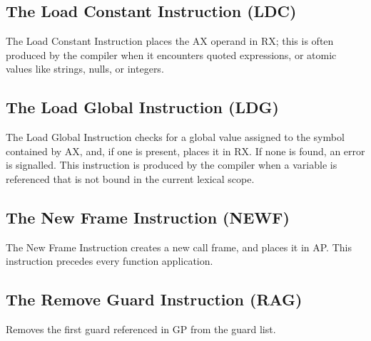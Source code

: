 \documentclass[notitlepage,oneside]{book}
\begin{document}

\subsection{The Load Constant Instruction (LDC)}
\label{i-ldc}

The Load Constant Instruction places the AX operand in RX; this is often produced by the compiler when it encounters quoted expressions, or atomic values like strings, nulls, or integers.


\subsection{The Load Global Instruction (LDG)}
\label{i-ldg}

The Load Global Instruction checks for a global value assigned to the symbol contained by AX, and, if one is present, places it in RX.  If none is found, an error is signalled.  This instruction is produced by the compiler when a variable is referenced that is not bound in the current lexical scope. 


\subsection{The New Frame Instruction (NEWF)}
\label{i-newf}

The New Frame Instruction creates a new call frame, and places it in AP. This instruction precedes every function application.


\subsection{The Remove Guard Instruction (RAG)}
\label{i-rag}

Removes the first guard referenced in GP from the guard list.

\end{document}
